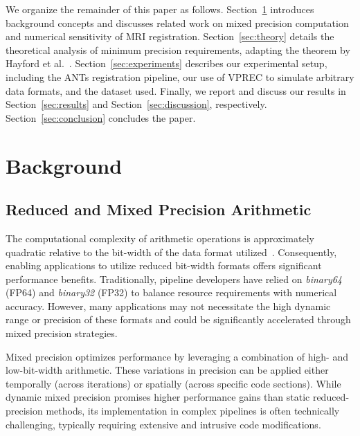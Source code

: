 \documentclass[journal,twoside,web]{ieeecolor}
\begin{document}
We organize the remainder of this paper as follows. Section~\ref{sec:background} introduces background concepts and discusses related work on mixed precision computation and numerical sensitivity of MRI registration. Section~\ref{sec:theory} details the theoretical analysis of minimum precision requirements, adapting the theorem by Hayford et al.~\cite{Hayford2024-kb}. Section~\ref{sec:experiments} describes our experimental setup, including the ANTs registration pipeline, our use of VPREC to simulate arbitrary data formats, and the dataset used. Finally, we report and discuss our results in Section~\ref{sec:results} and Section~\ref{sec:discussion}, respectively. Section~\ref{sec:conclusion} concludes the paper.

\section{Background}
\label{sec:background}

\subsection{Reduced and Mixed Precision Arithmetic}
The computational complexity of arithmetic operations is approximately quadratic relative to the bit-width of the data format utilized~\cite{Wang2019-qe}. Consequently, enabling applications to utilize reduced bit-width formats offers significant performance benefits. Traditionally, pipeline developers have relied on \textit{binary64} (FP64) and \textit{binary32} (FP32) to balance resource requirements with numerical accuracy. However, many applications may not necessitate the high dynamic range or precision of these formats and could be significantly accelerated through mixed precision strategies.

Mixed precision optimizes performance by leveraging a combination of high- and low-bit-width arithmetic. These variations in precision can be applied either temporally (across iterations) or spatially (across specific code sections). While dynamic mixed precision promises higher performance gains than static reduced-precision methods, its implementation in complex pipelines is often technically challenging, typically requiring extensive and intrusive code modifications.
\end{document}
